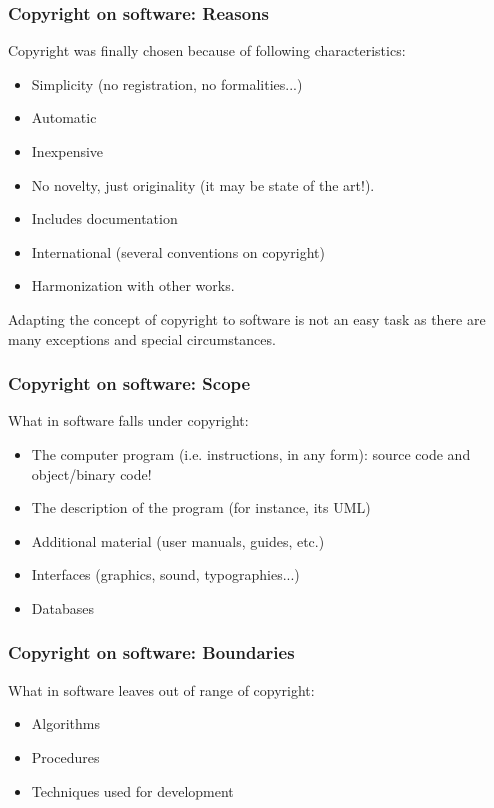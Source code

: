 
\begin{frame}
\frametitle{Copyright on software: Reasons}

Copyright was finally chosen because of following characteristics:

\begin{itemize}
\item Simplicity (no registration, no formalities...)
\item Automatic
\item Inexpensive
\item No novelty, just originality (it may be state of the art!). 
\item Includes documentation
\item International (several conventions on copyright)
\item Harmonization with other works.
\end{itemize}

Adapting the concept of copyright to software is not an easy task as
there are many exceptions and special circumstances.

\end{frame}



\begin{frame}
\frametitle{Copyright on software: Scope}

What in software falls under copyright:

\begin{itemize}
\item The computer program (i.e. instructions, in any form): 
      source code and object/binary code!
\item The description of the program (for instance, its UML)
\item Additional material (user manuals, guides, etc.)
\item Interfaces (graphics, sound, typographies...)
\item Databases
\end{itemize}

\end{frame}


\begin{frame}
\frametitle{Copyright on software: Boundaries}

What in software leaves out of range of copyright:

\begin{itemize}
\item Algorithms 
\item Procedures 
\item Techniques used for development 
\end{itemize}

\end{frame}


